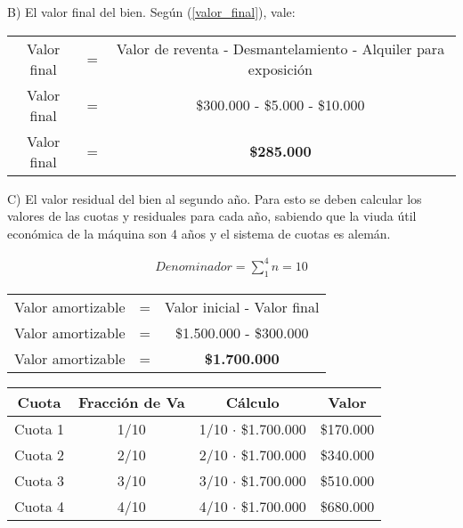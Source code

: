 \documentclass[12pt,a4paper]{article}
\begin{document}
        \hrulefill
        
        B) El valor final del bien. Según (\ref{valor_final}), vale:

		\begin{table}[H]
		\centering
        	\begin{tabular}{ c c c }
            	Valor final	&=&		Valor de reventa - Desmantelamiento - Alquiler para exposición \\
                Valor final	&=&		\$300.000 - \$5.000 - \$10.000 \\
                Valor final	&=&		\textbf{\$285.000}
			\end{tabular}
		\end{table}
        
        \hrulefill
        
        C) El valor residual del bien al segundo año. Para esto se deben calcular los valores de las cuotas y residuales para cada año, sabiendo que la viuda útil económica de la máquina son 4 años y el sistema de cuotas es alemán.
        
        \begin{align*}
        	Denominador = \sum_{1}^{4} n = 10
		\end{align*}
        
		\begin{table}[H]
		\centering
        	\begin{tabular}{ c c c }
            	Valor amortizable	&=&		Valor inicial - Valor final \\
                Valor amortizable	&=&		\$1.500.000 - \$300.000 \\
                Valor amortizable	&=&		\textbf{\$1.700.000}
			\end{tabular}
		\end{table}
        
        \newpage
        
        \begin{table}[H]
        \centering
        	\begin{tabular}{ | c | c | c | c | }
            	\hline
                Cuota	&	Fracción de Va	&	Cálculo						&	Valor		\\ \hline
                Cuota 1	&	1/10			&	1/10 $\cdot$ \$1.700.000	&	\$170.000	\\ \hline
                Cuota 2	&	2/10			&	2/10 $\cdot$ \$1.700.000	&	\$340.000	\\ \hline
                Cuota 3	&	3/10			&	3/10 $\cdot$ \$1.700.000	&	\$510.000	\\ \hline
                Cuota 4	&	4/10			&	4/10 $\cdot$ \$1.700.000	&	\$680.000	\\ \hline
			\end{tabular}
		\end{table}
        
\end{document}
